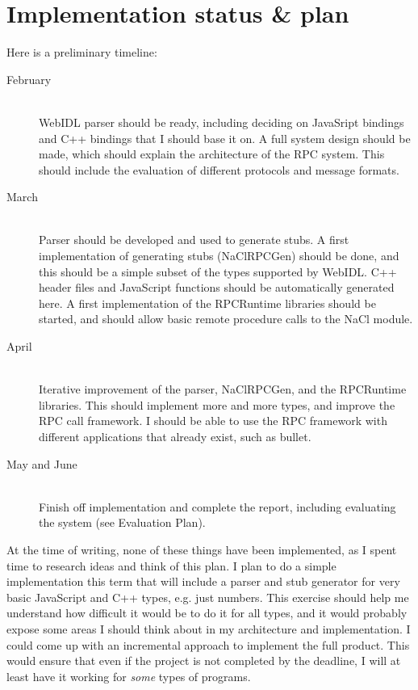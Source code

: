 \section{Implementation status \& plan}
Here is a preliminary timeline:

\begin{description}
	\item[February]
	~\\
	WebIDL parser should be ready, including deciding on JavaSript bindings and C++ bindings that I should base it on. A full system design should be made, which should explain the architecture of the RPC system. This should include the evaluation of different protocols and message formats.

	\item[March]
	~\\
	Parser should be developed and used to generate stubs. A first implementation of generating stubs (NaClRPCGen) should be done, and this should be a simple subset of the types supported by WebIDL. C++ header files and JavaScript functions should be automatically generated here. A first implementation of the RPCRuntime libraries should be started, and should allow basic remote procedure calls to the NaCl module.

	\item[April]
	~\\
	Iterative improvement of the parser, NaClRPCGen, and the RPCRuntime libraries. This should implement more and more types, and improve the RPC call framework. I should be able to use the RPC framework with different applications that already exist, such as bullet.

	\item[May and June]
	~\\
	Finish off implementation and complete the report, including evaluating the system (see Evaluation Plan). 

\end{description}

At the time of writing, none of these things have been implemented, as I spent time to research ideas and think of this plan. I plan to do a simple implementation this term that will include a parser and stub generator for very basic JavaScript and C++ types, e.g. just numbers. This exercise should help me understand how difficult it would be to do it for all types, and it would probably expose some areas I should think about in my architecture and implementation. I could come up with an incremental approach to implement the full product. This would ensure that even if the project is not completed by the deadline, I will at least have it working for \emph{some} types of programs.

